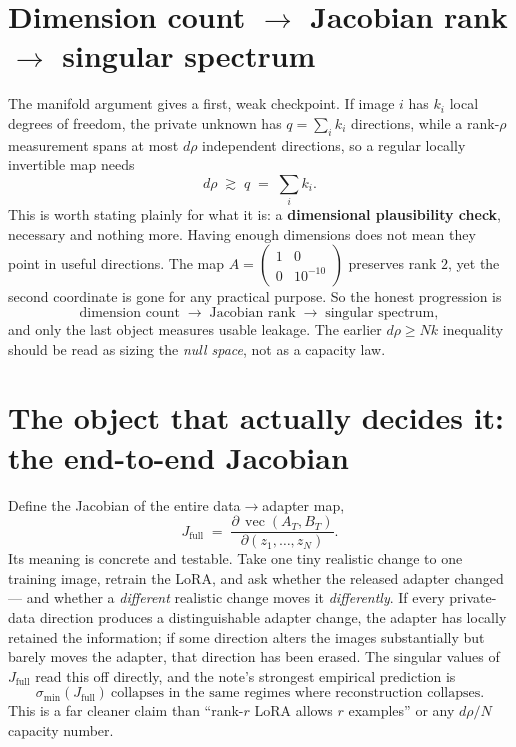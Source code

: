 \section{Dimension count $\to$ Jacobian rank $\to$ singular spectrum}
The manifold argument gives a first, weak checkpoint. If image $i$ has $k_i$ local
degrees of freedom, the private unknown has $q=\sum_i k_i$ directions, while a rank-$\rho$
measurement spans at most $d\rho$ independent directions, so a regular locally invertible
map needs
\[
d\rho \;\gtrsim\; q \;=\;\textstyle\sum_i k_i .
\]
This is worth stating plainly for what it is: a \textbf{dimensional plausibility check},
necessary and nothing more. Having enough dimensions does not mean they point in useful
directions. The map
$A=\left(\begin{smallmatrix}1&0\\0&10^{-10}\end{smallmatrix}\right)$ preserves rank $2$,
yet the second coordinate is gone for any practical purpose. So the honest progression is
\[
\boxed{\text{dimension count}}\;\longrightarrow\;
\boxed{\text{Jacobian rank}}\;\longrightarrow\;
\boxed{\text{singular spectrum}} ,
\]
and only the last object measures usable leakage. The earlier $d\rho\ge Nk$ inequality
should be read as sizing the \emph{null space}, not as a capacity law.

\section{The object that actually decides it: the end-to-end Jacobian}
Define the Jacobian of the entire data$\to$adapter map,
\[
J_{\mathrm{full}} \;=\;
\frac{\partial\,\operatorname{vec}(A_T,B_T)}{\partial(z_1,\dots,z_N)} .
\]
Its meaning is concrete and testable. Take one tiny realistic change to one training
image, retrain the LoRA, and ask whether the released adapter changed --- and whether a
\emph{different} realistic change moves it \emph{differently}. If every private-data
direction produces a distinguishable adapter change, the adapter has locally retained the
information; if some direction alters the images substantially but barely moves the
adapter, that direction has been erased. The singular values of $J_{\mathrm{full}}$ read
this off directly, and the note's strongest empirical prediction is
\[
\boxed{\;\sigma_{\min}(J_{\mathrm{full}})\ \text{collapses in the same regimes where
reconstruction collapses.}\;}
\]
This is a far cleaner claim than ``rank-$r$ LoRA allows $r$ examples'' or any
$d\rho/N$ capacity number.

